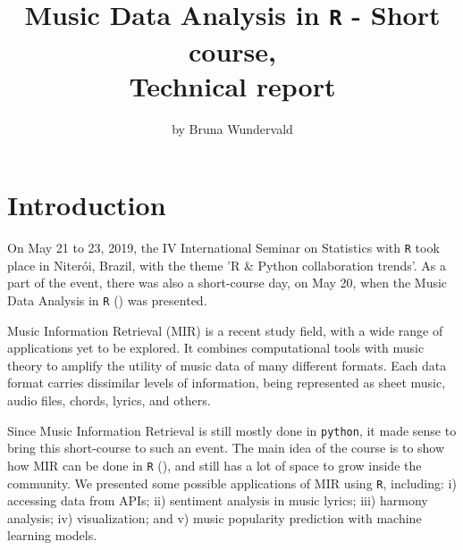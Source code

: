 \title{Music Data Analysis in \texttt{R} - Short course, \\
Technical report}
\author{by Bruna Wundervald}

\maketitle



\section{Introduction}

On May 21 to 23, 2019, the IV International Seminar on 
Statistics with \texttt{R} took place in Niter\'oi, Brazil, 
with the theme 'R & Python collaboration trends'. 
As a part of the event, there was also a short-course day,
on May 20, when the Music Data Analysis in \texttt{R} (\cite{musicdatainR}) was presented. 

Music Information Retrieval (MIR) is a recent study field, with
a wide range of applications yet to be explored. It combines
computational tools with music theory to amplify the utility
of music data of many different formats. Each data format
carries dissimilar levels of information, being represented
as sheet music, audio files, chords, lyrics, and others.

Since Music Information Retrieval is still mostly done
in \texttt{python}, it made sense to bring this short-course
to such an event. The main idea of the course is to show
how MIR can be done in \texttt{R} (\cite{R}), and still has a lot
of space to grow inside the community. We presented
some possible applications of MIR using \texttt{R}, including:
i) accessing data from APIs; 
ii) sentiment analysis in music lyrics; iii) harmony analysis; 
iv) visualization;  and 
v) music popularity prediction with machine learning models. 

